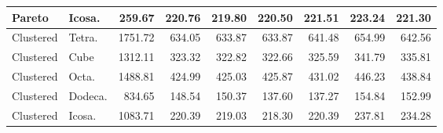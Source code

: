 \begin{tabular}{llrrrrrrr}
Pareto & Icosa. & 259.67 & 220.76 & 219.80 & 220.50 & 221.51 & 223.24 & 221.30 \\
\midrule
Clustered & Tetra. & 1751.72 & 634.05 & 633.87 & 633.87 & 641.48 & 654.99 & 642.56 \\
Clustered & Cube & 1312.11 & 323.32 & 322.82 & 322.66 & 325.59 & 341.79 & 335.81 \\
Clustered & Octa. & 1488.81 & 424.99 & 425.03 & 425.87 & 431.02 & 446.23 & 438.84 \\
Clustered & Dodeca. & 834.65 & 148.54 & 150.37 & 137.60 & 137.27 & 154.84 & 152.99 \\
Clustered & Icosa. & 1083.71 & 220.39 & 219.03 & 218.30 & 220.39 & 237.81 & 234.28 \\
\midrule
\bottomrule
\end{tabular}
